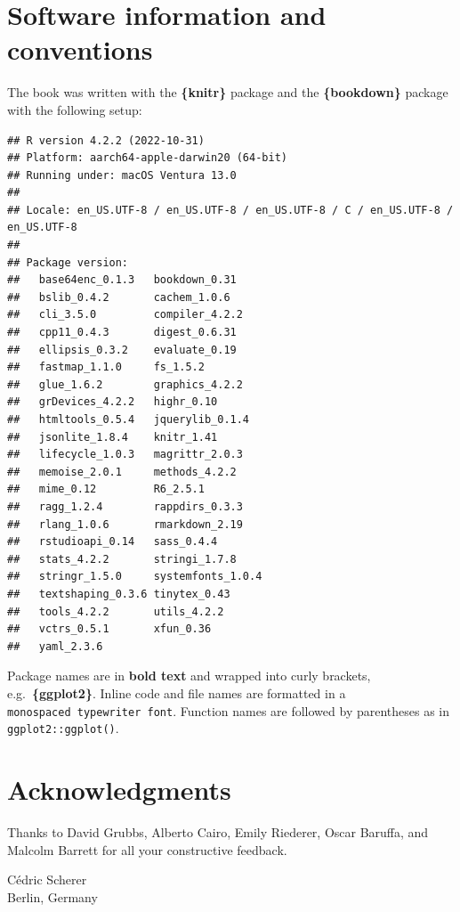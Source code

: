 \documentclass[
]{krantz}
\begin{document}
\hypertarget{software-information-and-conventions}{%
\section*{Software information and conventions}\label{software-information-and-conventions}}


The book was written with the \textbf{\{knitr\}} package \citep{xie2015} and the \textbf{\{bookdown\}} package \citep{R-bookdown} with the following setup:

\begin{verbatim}
## R version 4.2.2 (2022-10-31)
## Platform: aarch64-apple-darwin20 (64-bit)
## Running under: macOS Ventura 13.0
## 
## Locale: en_US.UTF-8 / en_US.UTF-8 / en_US.UTF-8 / C / en_US.UTF-8 / en_US.UTF-8
## 
## Package version:
##   base64enc_0.1.3   bookdown_0.31    
##   bslib_0.4.2       cachem_1.0.6     
##   cli_3.5.0         compiler_4.2.2   
##   cpp11_0.4.3       digest_0.6.31    
##   ellipsis_0.3.2    evaluate_0.19    
##   fastmap_1.1.0     fs_1.5.2         
##   glue_1.6.2        graphics_4.2.2   
##   grDevices_4.2.2   highr_0.10       
##   htmltools_0.5.4   jquerylib_0.1.4  
##   jsonlite_1.8.4    knitr_1.41       
##   lifecycle_1.0.3   magrittr_2.0.3   
##   memoise_2.0.1     methods_4.2.2    
##   mime_0.12         R6_2.5.1         
##   ragg_1.2.4        rappdirs_0.3.3   
##   rlang_1.0.6       rmarkdown_2.19   
##   rstudioapi_0.14   sass_0.4.4       
##   stats_4.2.2       stringi_1.7.8    
##   stringr_1.5.0     systemfonts_1.0.4
##   textshaping_0.3.6 tinytex_0.43     
##   tools_4.2.2       utils_4.2.2      
##   vctrs_0.5.1       xfun_0.36        
##   yaml_2.3.6
\end{verbatim}

Package names are in \textbf{bold text} and wrapped into curly brackets, e.g.~\textbf{\{ggplot2\}}. Inline code and file names are formatted in a \texttt{monospaced\ typewriter\ font}. Function names are followed by parentheses as in \texttt{ggplot2::ggplot()}.

\hypertarget{acknowledgments}{%
\section*{Acknowledgments}\label{acknowledgments}}


Thanks to David Grubbs, Alberto Cairo, Emily Riederer, Oscar Baruffa, and Malcolm Barrett for all your constructive feedback.

\begin{flushright}
Cédric Scherer\\
Berlin, Germany
\end{flushright}
\end{document}
